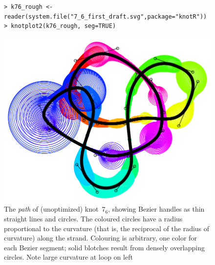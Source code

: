 \documentclass{birkjour}
\theoremstyle{definition}
\theoremstyle{remark}
\numberwithin{equation}{section}
\begin{document}
\begin{figure}[htbp]
  \begin{center}
\begin{verbatim}
> k76_rough <- reader(system.file("7_6_first_draft.svg",package="knotR"))
> knotplot2(k76_rough, seg=TRUE)
\end{verbatim}

\begin{centering}
\includegraphics[scale = 0.9]{knot-7_6_rough}
\caption{The \emph{path} of (unoptimized) \label{7_6_rough}
  knot~$7_6$, showing Bezier handles as thin straight lines and
  circles.  The coloured circles have a radius proportional to the
  curvature (that is, the reciprocal of the radius of curvature) along
  the strand.  Colouring is arbitrary, one color for each Bezier
  segment; solid blotches result from densely overlapping circles.
  Note large curvature at loop on left}
  \end{centering}
  \end{center}
\end{figure}
\end{document}
